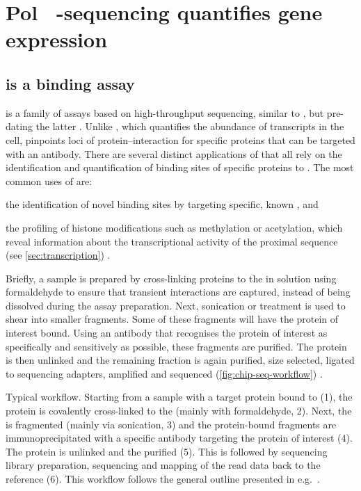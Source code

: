 \section{Pol~ -sequencing quantifies  gene expression}
\label{sec:chip}

\subsection{ is a  binding assay}

 is a family of assays based on high-throughput sequencing,
similar to \rnaseq, but pre-dating the latter \citep{Johnson:2007}. Unlike
\rnaseq, which quantifies the abundance of \rna transcripts in the cell,
\chipseq pinpoints loci of protein--\dna interaction for specific proteins that
can be targeted with an antibody. There are several distinct applications of
\chipseq that all rely on the identification and quantification of binding sites
of specific proteins to \dna. The most common uses of \chipseq are:
\begin{enumerate*}
    \item the identification of novel \tf binding sites by targeting specific,
        known \tf[s], and
    \item the profiling of histone modifications such as methylation or
        acetylation, which reveal information about the transcriptional activity
        of the proximal sequence (see \cref{sec:transcription})
        \citep{Barski:2007}.
\end{enumerate*}

Briefly, a sample is prepared by cross-linking proteins to the \dna in solution
using formaldehyde to ensure that transient interactions are captured, instead
of being dissolved during the assay preparation. Next, sonication or
 treatment is used to shear \dna into smaller
fragments. Some of these fragments will have the protein of interest bound.
Using an antibody that recognises the protein of interest as specifically and
sensitively as possible, these fragments are purified. The protein is then
unlinked and the remaining \dna fraction is again purified, size selected,
ligated to sequencing adapters, amplified and sequenced
(\cref{fig:chip-seq-workflow}) \citep{Park:2009}.

    {Typical  workflow.}
    {Starting from a sample with a target protein bound to \dna (\num{1}),
    the protein is covalently cross-linked to the \dna (mainly with
    formaldehyde, \num{2}). Next, the \dna is fragmented (mainly via sonication,
    \num{3}) and the protein-bound fragments are immunoprecipitated with a
    specific antibody targeting the protein of interest (\num{4}). The protein
    is unlinked and the \dna purified (\num{5}). This is followed by sequencing
    library preparation, sequencing and mapping of the read data back to the
    reference (\num{6}). This workflow follows the general outline presented in
    e.g.\ \citet{Landt:2012}.}


